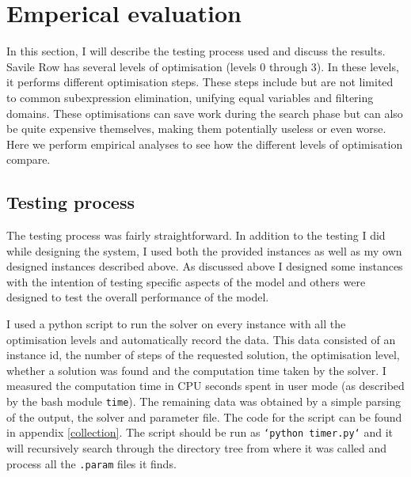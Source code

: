 \documentclass[british]{article}
\newcommand{\code}[1]{\texttt{#1}}
\begin{document}
	\section{Emperical evaluation}
	\label{results}
	In this section, I will describe the testing process used and discuss the results. Savile Row has several levels of optimisation (levels 0 through 3). In these levels, it performs different optimisation steps. These steps include but are not limited to common subexpression elimination, unifying equal variables and filtering domains. These optimisations can save work during the search phase but can also be quite expensive themselves, making them potentially useless or even worse. Here we perform empirical analyses to see how the different levels of optimisation compare.  
	
	\subsection{Testing process}
	\label{testing}
	The testing process was fairly straightforward. In addition to the testing I did while designing the system, I used both the provided instances as well as my own designed instances described above. As discussed above I designed some instances with the intention of testing specific aspects of the model and others were designed to test the overall performance of the model. 
	
	I used a python script to run the solver on every instance with all the optimisation levels and automatically record the data. This data consisted of an instance id, the number of steps of the requested solution, the optimisation level, whether a solution was found and the computation time taken by the solver. I measured the computation time in CPU seconds spent in user mode (as described by the bash module \code{time}).  The remaining data was obtained by a simple parsing of the output, the solver and parameter file. The code for the script can be found in appendix \ref{collection}. The script should be run as \code{`python timer.py`} and it will recursively search through the directory tree from where it was called and process all the \code{.param} files it finds. 
	
\end{document}
